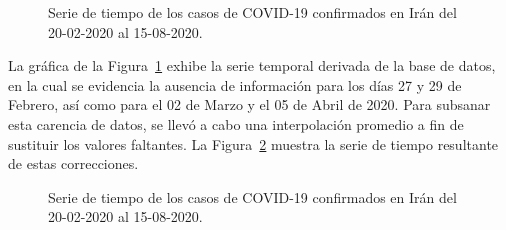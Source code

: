 \documentclass[
  us-letterpaper,
]{scrreprt}
\theoremstyle{plain}
\theoremstyle{definition}
\theoremstyle{definition}
\theoremstyle{plain}
\theoremstyle{remark}
\begin{document}
\begin{figure}


\caption{\label{fig-oripdf}Serie de tiempo de los casos de COVID-19
confirmados en Irán del 20-02-2020 al 15-08-2020.}

\end{figure}%

La gráfica de la Figura~\ref{fig-oripdf} exhibe la serie temporal
derivada de la base de datos, en la cual se evidencia la ausencia de
información para los días 27 y 29 de Febrero, así como para el 02 de
Marzo y el 05 de Abril de 2020. Para subsanar esta carencia de datos, se
llevó a cabo una interpolación promedio a fin de sustituir los valores
faltantes. La Figura~\ref{fig-tspdf} muestra la serie de tiempo
resultante de estas correcciones.

\begin{figure}


\caption{\label{fig-tspdf}Serie de tiempo de los casos de COVID-19
confirmados en Irán del 20-02-2020 al 15-08-2020.}

\end{figure}%
\end{document}
